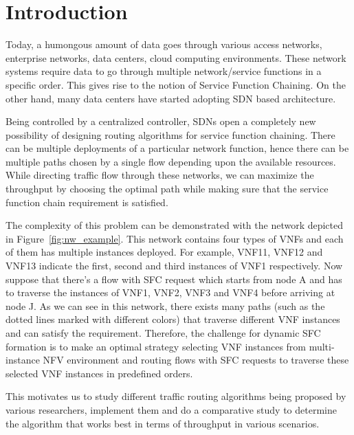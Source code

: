 
\section{Introduction}
\label{sec:intro}

Today, a humongous amount of data goes through various access networks, enterprise networks, data centers, cloud computing environments. These network systems require data to go through multiple network/service functions in a specific order. This gives rise to the notion of Service Function Chaining. On the other hand, many data centers have started adopting SDN based architecture. 

Being controlled by a centralized controller, SDNs open a completely new possibility of designing routing algorithms for service function chaining. There can be multiple deployments of a particular network function, hence there can be multiple paths chosen by a single flow depending upon the available resources. While directing traffic flow through these networks, we can maximize the throughput by choosing the optimal path while making sure that the service function chain requirement is satisfied. 

The complexity of this problem can be demonstrated with the network depicted in Figure~\ref{fig:nw_example}. This network contains four types of VNFs and each of them has multiple instances deployed. For example, VNF11, VNF12 and VNF13 indicate the first, second and third instances of VNF1 respectively. Now suppose that there's a flow with SFC request which starts from node A and has to traverse the instances of VNF1, VNF2, VNF3 and VNF4 before arriving at node J. As we can see in this network, there exists many paths (such as the dotted lines marked with different colors) that traverse different VNF instances and can satisfy the requirement. Therefore, the challenge for dynamic SFC formation is to make an optimal strategy selecting VNF instances from multi-instance NFV environment and routing flows with SFC requests to traverse these selected VNF instances in predefined orders.


This motivates us to study different traffic routing algorithms being proposed by various researchers, implement them and do a comparative study to determine the algorithm that works best in terms of throughput in various scenarios.

